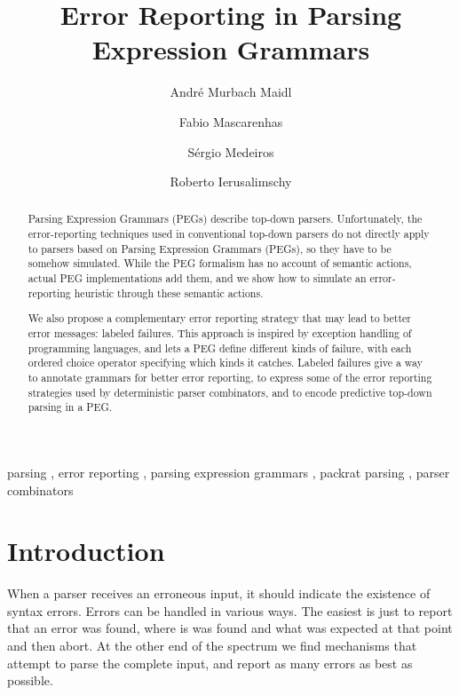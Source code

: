 \documentclass[3p,12pt,singlecolumn]{elsarticle}
\title{Error Reporting in Parsing Expression Grammars}
\begin{document}
\begin{frontmatter}

\author{André Murbach Maidl}
\address{Polytechnic School -- PUCPR --
Curitiba -- Brazil}

\author{Fabio Mascarenhas}
\address{Department of Computer Science -- UFRJ --
Rio de Janeiro -- Brazil}

\author{Sérgio Medeiros}
\address{School of Science and Technology -- UFRN --
	Natal -- Brazil}

\author{Roberto Ierusalimschy}
\address{Department of Computer Science -- PUC-Rio --
Rio de Janeiro -- Brazil}

\begin{abstract}
Parsing Expression Grammars (PEGs) describe top-down parsers.
Unfortunately, the error-reporting techniques used in conventional top-down parsers do not directly apply to parsers based on Parsing Expression Grammars (PEGs), so they have to be somehow simulated.
While the PEG formalism has no account of semantic actions, actual
PEG implementations add them, and we show how to simulate an
error-reporting heuristic through these semantic actions.  

We also propose a complementary error reporting strategy
that may lead to better error messages: labeled failures.
This approach is inspired by exception handling of
programming languages, and lets a PEG define different
kinds of failure, with each ordered choice operator
specifying which kinds it catches. Labeled failures
give a way to annotate grammars for better
error reporting, to express some of the error
reporting strategies used by deterministic parser combinators,
and to encode predictive top-down parsing in a PEG.
\end{abstract}

\begin{keyword}
parsing \sep
error reporting \sep
parsing expression grammars \sep
packrat parsing \sep
parser combinators
\end{keyword}

\end{frontmatter}

\section{Introduction} \label{sec:intro}

When a parser receives an erroneous input,
it should indicate the existence of syntax errors.
Errors can be handled in various ways. The easiest is just to report that an error was found, where is was found and what was expected at that point and then abort. At the other end of the spectrum we find mechanisms that attempt to parse the complete input, and report as many errors as best as  possible.
\end{document}
